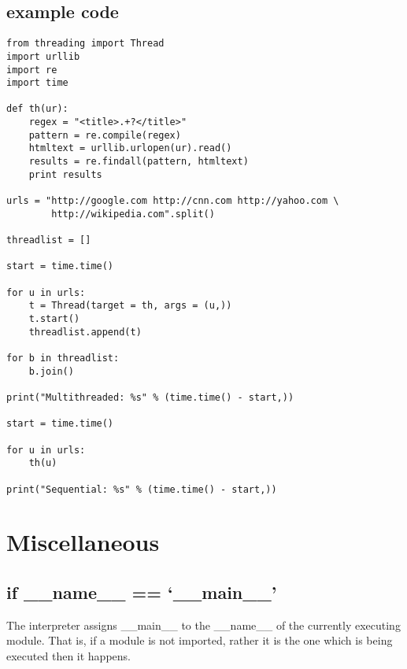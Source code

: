 \documentclass[a4paper, 12pt]{article}
\begin{document}
\subsection{example code}
\begin{verbatim}
from threading import Thread
import urllib
import re
import time

def th(ur):
    regex = "<title>.+?</title>"
    pattern = re.compile(regex)
    htmltext = urllib.urlopen(ur).read()
    results = re.findall(pattern, htmltext)
    print results

urls = "http://google.com http://cnn.com http://yahoo.com \
        http://wikipedia.com".split()

threadlist = []

start = time.time()

for u in urls:
    t = Thread(target = th, args = (u,))
    t.start()
    threadlist.append(t)

for b in threadlist:
    b.join()

print("Multithreaded: %s" % (time.time() - start,))

start = time.time()

for u in urls:
    th(u)

print("Sequential: %s" % (time.time() - start,))
\end{verbatim}

\section{Miscellaneous}
\subsection{if \_\_name\_\_ == `\_\_main\_\_'}
The interpreter assigns \_\_main\_\_ to the \_\_name\_\_ of the currently executing module. That is, if a module is not imported, rather it is the one which is being executed then it happens.
\end{document}

